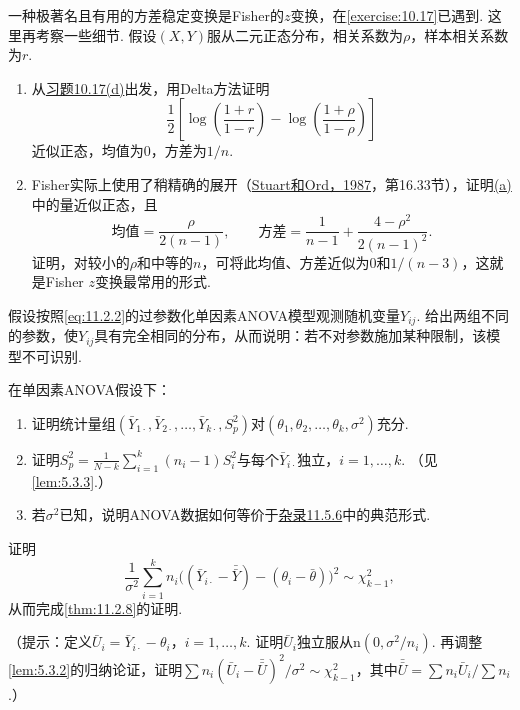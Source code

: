 \begin{exercise}\label{exercise:11.4}
一种极著名且有用的方差稳定变换是Fisher的$z$变换，在\autoref{exercise:10.17}已遇到. 这里再考察一些细节. 假设$(X,Y)$服从二元正态分布，相关系数为$\rho$，样本相关系数为$r$.
\begin{enumerate}[label=(\alph*)]
\item\label{item:11.4.a} 从\hyperref[item:10.17.d]{习题10.17(d)}出发，用Delta方法证明
$$\frac12\left[\log\left(\frac{1+r}{1-r}\right)-\log\left(\frac{1+\rho}{1-\rho}\right)\right]$$
近似正态，均值为0，方差为$1/n$.
\item\label{item:11.4.b} Fisher实际上使用了稍精确的展开（\hyperref[bib:source309]{Stuart和Ord，1987}，第16.33节），证明\hyperref[item:11.4.a]{(a)}中的量近似正态，且
$$\text{均值}=\frac\rho{2(n-1)},\qquad\text{方差}=\frac1{n-1}+\frac{4-\rho^2}{2(n-1)^2}.$$
证明，对较小的$\rho$和中等的$n$，可将此均值、方差近似为0和$1/(n-3)$，这就是Fisher $z$变换最常用的形式.
\end{enumerate}
\end{exercise}

\begin{exercise}\label{exercise:11.5}
假设按照\eqref{eq:11.2.2}的过参数化单因素ANOVA模型观测随机变量$Y_{ij}$. 给出两组不同的参数，使$Y_{ij}$具有完全相同的分布，从而说明：若不对参数施加某种限制，该模型不可识别.
\end{exercise}

\begin{exercise}\label{exercise:11.6}
在单因素ANOVA假设下：
\begin{enumerate}[label=(\alph*)]
\item\label{item:11.6.a} 证明统计量组$(\bar Y_{1\cdot},\bar Y_{2\cdot},\ldots,\bar Y_{k\cdot},S_p^2)$对$(\theta_1,\theta_2,\ldots,\theta_k,\sigma^2)$充分.
\item\label{item:11.6.b} 证明$S_p^2=\frac1{N-k}\sum_{i=1}^k(n_i-1)S_i^2$与每个$\bar Y_{i\cdot}$独立，$i=1,\ldots,k$. （见\autoref{lem:5.3.3}.）
\item\label{item:11.6.c} 若$\sigma^2$已知，说明ANOVA数据如何等价于\hyperref[sec:11.5.6]{杂录11.5.6}中的典范形式.
\end{enumerate}
\end{exercise}

\begin{exercise}\label{exercise:11.7}
证明
$$\frac1{\sigma^2}\sum_{i=1}^kn_i\bigl((\bar Y_{i\cdot}-\bar{\bar Y})-(\theta_i-\bar\theta)\bigr)^2\sim\chi^2_{k-1},$$
从而完成\autoref{thm:11.2.8}的证明.

（提示：定义$\bar U_i=\bar Y_{i\cdot}-\theta_i$，$i=1,\ldots,k$. 证明$\bar U_i$独立服从$\mathrm n(0,\sigma^2/n_i)$. 再调整\autoref{lem:5.3.2}的归纳论证，证明$\sum n_i(\bar U_i-\bar{\bar U})^2/\sigma^2\sim\chi^2_{k-1}$，其中$\bar{\bar U}=\sum n_i\bar U_i/\sum n_i$.）
\end{exercise}

